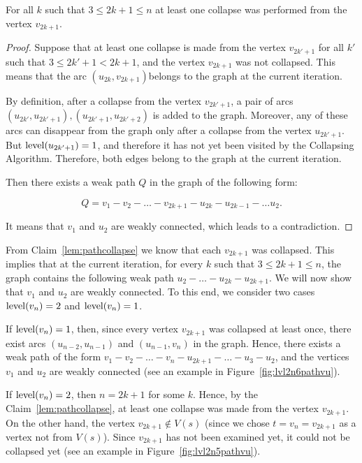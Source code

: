 \begin{claim}
\label{lem:pathcollapse}
For all $ k $ such that $ 3 \le 2k + 1 \le n $ at least one collapse was performed from the vertex $ v_{2k + 1} $.
\end{claim}
\begin{proof}
Suppose that at least one collapse is made from the vertex $ v_{2k '+ 1} $ for all $ k' $ such that $ 3 \le 2k '+ 1 <2k + 1 $, and the vertex $ v_{2k + 1} $ was not collapsed. This means that the arc $ (u_{2k}, v_{2k + 1}) $belongs to the graph at the current iteration.

By definition, after a collapse from the vertex $ v_{2k '+ 1} $, a pair of arcs $ (u_{2k'}, u_{2k '+ 1}), (u_{2k' + 1}, u_{2k '+ 2}) $ is added to the graph. Moreover, any of these arcs can disappear from the graph only after a collapse from the vertex $ u_ {2k '+ 1} $. But $\operatorname{level}(u_ {2k '+ 1})= 1 $, and therefore it has not yet been visited by the Collapsing Algorithm. Therefore, both edges belong to the graph at the current iteration.

Then there exists a weak path $ Q $ in the graph of the following form:

$$
Q = v_1 - v_2 - \ldots - v_{2k+1} - u_{2k} - u_{2k-1} - \ldots u_2.
$$

It means that $v_1$ and $u_2$ are weakly connected, which leads to a contradiction.
\end{proof}

From Claim~\ref{lem:pathcollapse} we know that each $v_{2k+1}$ was collapsed. This implies that at the current iteration, for every $k$ such that $3\le 2k+1\le n$, the graph contains the following weak path $ u_2 - \ldots - u_{2k} - u_{2k + 1} $. We will now show that $v_1$ and $u_2$ are weakly connected. To this end, we consider two cases $ \operatorname{level} (v_{n}) = 2 $ and $ \operatorname{level} (v_{n}) = 1 $. 

If $ \operatorname{level} (v_{n}) = 1 $, then, since every vertex $ v_{2k + 1} $ was collapsed at least once, there exist arcs $(u_{n-2},u_{n-1} ) $ and $ (u_{n-1}, v_n) $ in the graph. Hence, there exists a weak path of the form $ v_1 - v_2 - \ldots - v_n - u_{2k + 1} - \ldots - u_3 - u_2 $, and the vertices $ v_1 $ and $ u_2 $ are weakly connected (see an example in Figure~\ref{fig:lvl2n6pathvu}).

If $ \operatorname{level} (v_{n}) = 2 $, then $ n = 2k + 1 $ for some $ k $. Hence, by the Claim~\ref{lem:pathcollapse}, at least one collapse was made from the vertex $ v_{2k + 1} $. On the other hand, the vertex $ v_{2k + 1} \notin V (s) $ (since we chose $t=v_n=v_{2k+1}$ as a vertex not from $V(s)$). Since $v_{2k+1}$ has not been examined yet, it could not be collapsed yet (see an example in Figure~\ref{fig:lvl2n5pathvu}).

